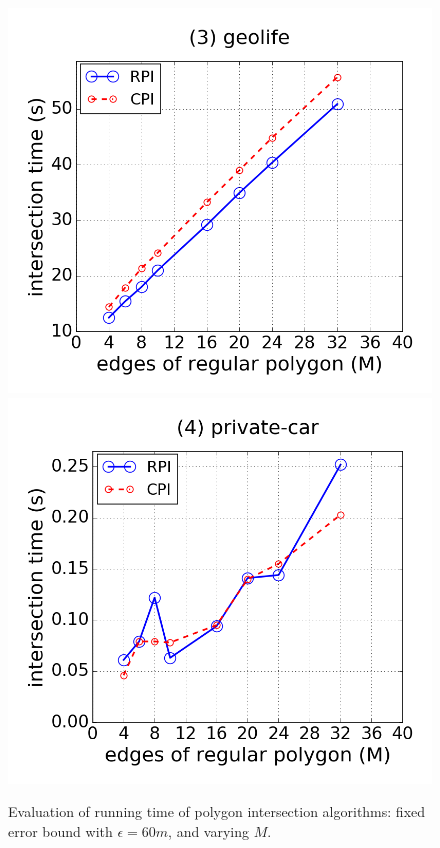 \begin{figure}[tb!]
\includegraphics[scale = 0.245]{figures/Exp-M-poly-time-geolife.png}
\includegraphics[scale = 0.245]{figures/Exp-M-poly-time-private.png}
\vspace{-2ex}
\caption{\small Evaluation of running time of polygon intersection algorithms: fixed error bound with $\epsilon=60m$, and varying $M$.}
\label{fig:m-poly-time}
\vspace{-1ex}
\end{figure}

